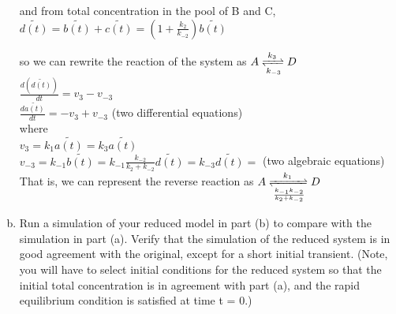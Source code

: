 \documentclass[paper=a4, fontsize=11pt]{scrartcl} %
\numberwithin{equation}{section} %
\numberwithin{figure}{section} %
\numberwithin{table}{section} %
\begin{document}
\begin{enumerate}[a)]
		and from total concentration in the pool of B and C,\\
		$\tilde{d(t)}=\tilde{b(t)}+\tilde{c(t)}=(1+\frac{k_2}{k_{-2}})\tilde{b(t)}$

		so we can rewrite the reaction of the system as $A \xrightleftharpoons[k_{-3}]{k_{3}} D$\\
		$\frac{d(\tilde{d(t)})}{dt}=v_{3}-v_{-3}$\\
		$\frac{d\tilde{a(t)}}{dt}=-v_{3}+v_{-3}$ (two differential equations)\\
		where\\
		$v_{3}=k_1\tilde{a(t)}=k_3\tilde{a(t)}$\\
		$v_{-3}=k_{-1}\tilde{b(t)}=k_{-1}\frac{k_{-2}}{k_2+k_{-2}}\tilde{d(t)}=k_{-3}\tilde{d(t)}=$
		(two algebraic equations)\\
		That is, we can represent the reverse reaction as $A \xrightleftharpoons[\frac{k_{-1}k_{-2}}{k_2+k_{-2}}]{k_{1}} D$

		\item Run a simulation of your reduced model in part (b) to compare with the simulation in part (a). Verify that the simulation of the reduced system is in good agreement with the original, except for a short initial transient. (Note, you will have to select initial conditions for the reduced system so that the initial total concentration is in agreement with part (a), and the rapid equilibrium condition is satisfied at time t = 0.)
	\end{enumerate}
\end{document}

